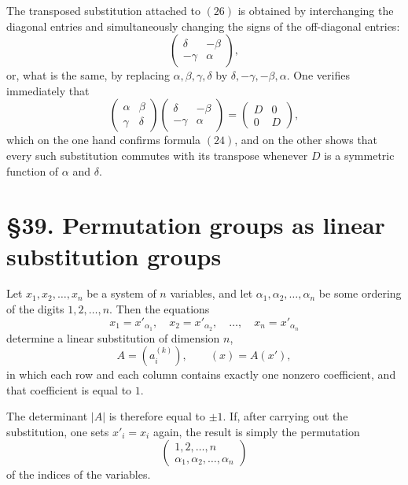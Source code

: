 \documentclass[11pt]{article}
\begin{document}
The transposed substitution attached to \((26)\) is obtained by interchanging the diagonal entries and simultaneously changing the signs of the off-diagonal entries:
\[
\begin{pmatrix}
\delta & -\beta\\
-\gamma & \alpha
\end{pmatrix},
\tag{31}
\]
or, what is the same, by replacing $\alpha,\beta,\gamma,\delta$ by $\delta,-\gamma,-\beta,\alpha$. One verifies immediately that
\[
\begin{pmatrix}
\alpha & \beta\\
\gamma & \delta
\end{pmatrix}
\begin{pmatrix}
\delta & -\beta\\
-\gamma & \alpha
\end{pmatrix}
=
\begin{pmatrix}
D & 0\\
0 & D
\end{pmatrix},
\tag{32}
\]
which on the one hand confirms formula \((24)\), and on the other shows that every such substitution commutes with its transpose whenever $D$ is a symmetric function of $\alpha$ and $\delta$.

\section*{\S 39. Permutation groups as linear substitution groups}

Let $x_1,x_2,\dots,x_n$ be a system of $n$ variables, and let $\alpha_1,\alpha_2,\dots,\alpha_n$ be some ordering of the digits $1,2,\dots,n$. Then the equations
\[
x_1=x'_{\alpha_1},\quad x_2=x'_{\alpha_2},\quad \dots,\quad x_n=x'_{\alpha_n}
\tag{33}
\]
determine a linear substitution of dimension $n$,
\[
A=(a_i^{(k)}),\qquad (x)=A(x'),
\tag{34}
\]
in which each row and each column contains exactly one nonzero coefficient, and that coefficient is equal to $1$.

The determinant $|A|$ is therefore equal to $\pm 1$. If, after carrying out the substitution, one sets $x'_i=x_i$ again, the result is simply the permutation
\[
\begin{pmatrix}
1,2,\dots,n\\
\alpha_1,\alpha_2,\dots,\alpha_n
\end{pmatrix}
\]
of the indices of the variables.
\end{document}
